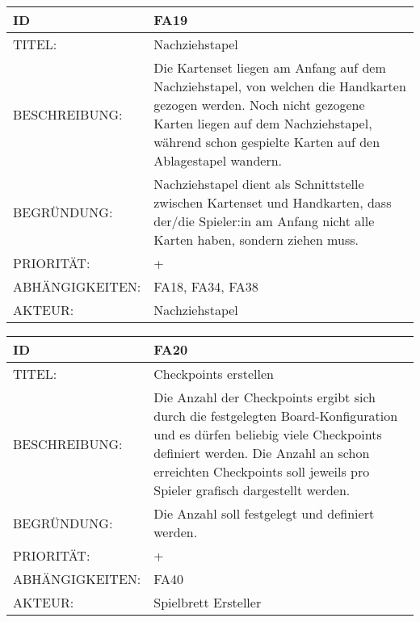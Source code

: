 \documentclass{uulm-assignment}
\begin{document}
    \begin{tabularx}{\textwidth}{|l|X |} \hline
        \textbf{ID} & \textbf{FA19} \\
        \hline
        TITEL: &  Nachziehstapel\\
        \hline
        BESCHREIBUNG: & Die Kartenset liegen am Anfang auf dem Nachziehstapel, von welchen die Handkarten gezogen werden. Noch nicht gezogene Karten liegen auf dem Nachziehstapel, während schon gespielte Karten auf den Ablagestapel wandern.
        \\
        \hline
        BEGRÜNDUNG: & Nachziehstapel dient als Schnittstelle zwischen Kartenset und Handkarten, dass der/die Spieler:in am Anfang nicht alle Karten haben, sondern ziehen muss.\\
        \hline
        PRIORITÄT: & +\\
        \hline
        ABHÄNGIGKEITEN: & FA18, FA34, FA38\\
        \hline
        AKTEUR: & Nachziehstapel\\
        \hline
    \end{tabularx}
    
    \begin{tabularx}{\textwidth}{|l|X |} \hline
        \textbf{ID} & \textbf{FA20} \\
        \hline
        TITEL: &  Checkpoints erstellen\\
        \hline
        BESCHREIBUNG: & 
         Die Anzahl der Checkpoints ergibt sich durch die festgelegten Board-Konfiguration und es dürfen beliebig viele Checkpoints definiert werden. Die Anzahl an schon erreichten Checkpoints soll jeweils pro Spieler grafisch dargestellt werden. 
        \\
        \hline
        BEGRÜNDUNG: & Die Anzahl soll festgelegt und definiert werden.\\
        \hline
        PRIORITÄT: & +\\
        \hline
        ABHÄNGIGKEITEN: & FA40\\
        \hline
        AKTEUR: & Spielbrett Ersteller\\
        \hline
    \end{tabularx}
    
\end{document}
